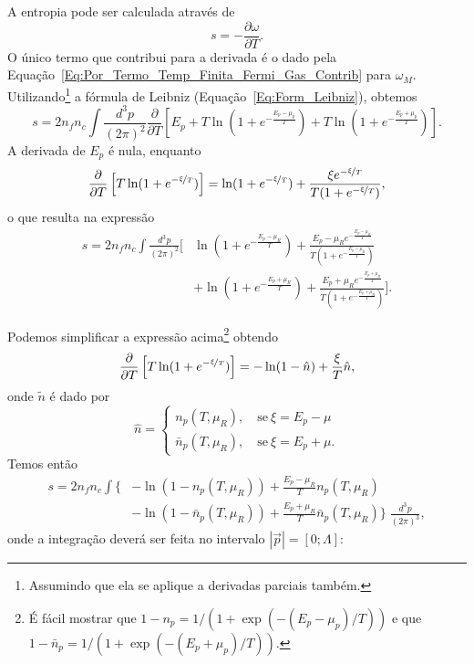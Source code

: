 A entropia pode ser calculada através de
\begin{equation}
	s = -\frac{\partial \omega}{\partial T}.
\end{equation}
%
O único termo que contribui para a derivada é o dado pela Equação~\eqref{Eq:Por_Termo_Temp_Finita_Fermi_Gas_Contrib} para $\omega_M$. Utilizando\footnote{Assumindo que ela se aplique a derivadas parciais também.} a fórmula de Leibniz (Equação~\eqref{Eq:Form_Leibniz}), obtemos
\begin{equation}
	s = 2 n_f n_c \int\frac{d^3p}{(2\pi)^2} \frac{\partial}{\partial T} \left[E_p + T \ln(1 + e^{-\frac{E_p - \mu_p}{T}}) + T \ln(1 + e^{-\frac{E_p + \mu_p}{T}})\right].
\end{equation}
%
A derivada de $E_p$ é nula, enquanto
\begin{equation}
	\frac{\partial}{\partial T}\left[T \ln(1 + e^{-\nicefrac{\xi}{T}})\right] = \ln (1 + e^{-\nicefrac{\xi}{T}}) + \frac{\xi e^{-\nicefrac{\xi}{T}}}{T(1+e^{-\nicefrac{\xi}{T}})} ,
\end{equation}
%
o que resulta na expressão
\begin{equation}\label{Eq:Densidade_de_entropia_deriv}
\begin{split}
	s = 2 n_f n_c \int\frac{d^3p}{(2\pi)^2} \Big[&\ln (1 + e^{-\frac{E_p - \mu_R}{T}}) + \frac{E_p - \mu_R e^{-\frac{E_p - \mu_R}{T}}}{T(1+e^{-\frac{E_p - \mu_R}{T}})} \\
	 &+ \ln (1 + e^{-\frac{E_p + \mu_R}{T}}) + \frac{E_p + \mu_R e^{-\frac{E_p + \mu_R}{T}}}{T(1+e^{-\frac{E_p + \mu_R}{T}})}\Big].
\end{split}
\end{equation}

Podemos simplificar a expressão acima\footnote{É fácil mostrar que $1 - n_p = 1/(1 + \exp(-(E_p - \mu_p)/T))$ e que $1 - \bar{n}_p = 1/(1 + \exp(-(E_p + \mu_p)/T))$.} obtendo
\begin{equation}
	\frac{\partial}{\partial T}\left[T \ln(1 + e^{-\nicefrac{\xi}{T}})\right] = - \ln(1-\hat{n}) + \frac{\xi}{T}\hat{n},
\end{equation}
%
onde $\tilde{n}$ é dado por
\begin{equation}
	\hat{n} = \begin{cases} n_p(T, \mu_R), \quad \textrm{se}~ \xi = E_p - \mu \\ \bar{n}_p(T, \mu_R), \quad \textrm{se}~ \xi = E_p + \mu. \end{cases}
\end{equation}
%
Temos então
\begin{equation}\label{Eq:Densidade_de_entropia_deriv_simplificada}
\begin{split}
	s = 2 n_f n_c \int \Big\{&-\ln(1 - n_p(T, \mu_R)) + \frac{E_p - \mu_R}{T} n_p(T, \mu_R) \\
	&- \ln (1 - \bar{n}_p(T, \mu_R)) + \frac{E_p + \mu_R}{T} \bar{n}_p(T, \mu_R)\Big\} \; \frac{d^3p}{(2\pi)^3},
\end{split}
\end{equation}
%
onde a integração deverá ser feita no intervalo $|\vec{p}| = [0;\Lambda]$:


